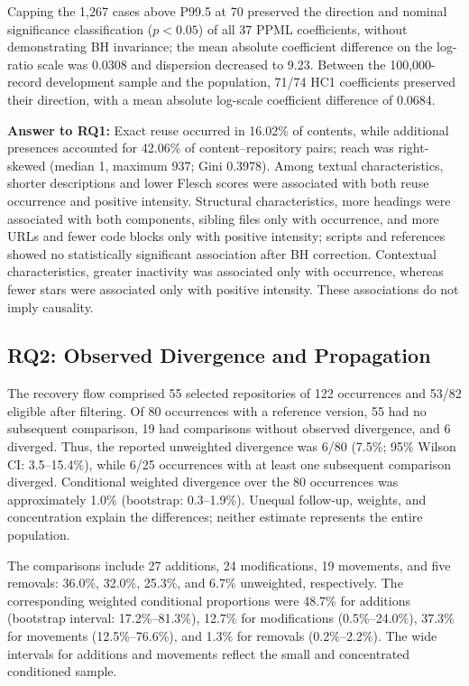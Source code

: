 \documentclass[conference]{IEEEtran}
\begin{document}
Capping the 1,267 cases above P99.5 at 70 preserved the direction and nominal significance classification ($p<0.05$) of all 37 PPML coefficients, without demonstrating BH invariance; the mean absolute coefficient difference on the log-ratio scale was 0.0308 and dispersion decreased to 9.23. Between the 100,000-record development sample and the population, 71/74 HC1 coefficients preserved their direction, with a mean absolute log-scale coefficient difference of 0.0684.

\begin{tcolorbox}[
    colback=gray!15,
    colframe=gray!50,
    boxrule=0.4pt,
    arc=1mm,
    left=2mm,
    right=2mm,
    top=1mm,
    bottom=1mm
]
\textbf{Answer to RQ1: } Exact reuse occurred in 16.02\% of contents, while additional presences accounted for 42.06\% of content–repository pairs; reach was right-skewed (median 1, maximum 937; Gini 0.3978). Among textual characteristics, shorter descriptions and lower Flesch scores were associated with both reuse occurrence and positive intensity. Structural characteristics, more headings were associated with both components, sibling files only with occurrence, and more URLs and fewer code blocks only with positive intensity; scripts and references showed no statistically significant association after BH correction. Contextual characteristics, greater inactivity was associated only with occurrence, whereas fewer stars were associated only with positive intensity. These associations do not imply causality.
\end{tcolorbox}


\subsection{RQ2: Observed Divergence and Propagation}
The recovery flow comprised 55 selected repositories of 122 occurrences and 53/82 eligible after filtering. Of 80 occurrences with a reference version, 55 had no subsequent comparison, 19 had comparisons without observed divergence, and 6 diverged. Thus, the reported unweighted divergence was 6/80 (7.5\%; 95\% Wilson CI: 3.5--15.4\%), while 6/25 occurrences with at least one subsequent comparison diverged. Conditional weighted divergence over the 80 occurrences was approximately 1.0\% (bootstrap: 0.3--1.9\%). Unequal follow-up, weights, and concentration explain the differences; neither estimate represents the entire population.

The comparisons include 27 additions, 24 modifications, 19 movements, and five removals: 36.0\%, 32.0\%, 25.3\%, and 6.7\% unweighted, respectively. The corresponding weighted conditional proportions were 48.7\% for additions (bootstrap interval: 17.2\%--81.3\%), 12.7\% for modifications (0.5\%--24.0\%), 37.3\% for movements (12.5\%--76.6\%), and 1.3\% for removals (0.2\%--2.2\%). The wide intervals for additions and movements reflect the small and concentrated conditioned sample.
\end{document}

